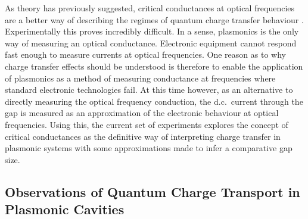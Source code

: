 \documentclass[a4paper]{article}
\begin{document}
As theory has previously suggested, critical conductances at optical frequencies are a better way of describing the regimes of quantum charge transfer behaviour \cite{perez2011, benz2014}. Experimentally this proves incredibly difficult. In a sense, plasmonics is the only way of measuring an optical conductance. Electronic equipment cannot respond fast enough to measure currents at optical frequencies. One reason as to why charge transfer effects should be understood is therefore to enable the application of plasmonics as a method of measuring conductance at frequencies where standard electronic technologies fail. At this time however, as an alternative to directly measuring the optical frequency conduction, the d.c.\ current through the gap is measured as an approximation of the electronic behaviour at optical frequencies. Using this, the current set of experiments explores the concept of critical conductances as the definitive way of interpreting charge transfer in plasmonic systems {\color{red}with some approximations made to infer a comparative gap size}. %

\subsection{Observations of Quantum Charge Transport in Plasmonic Cavities}
\end{document}
